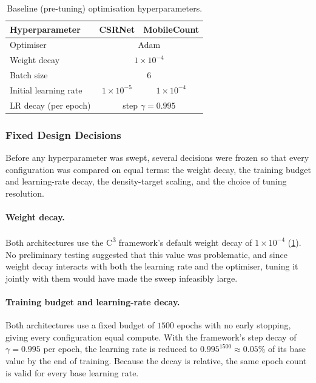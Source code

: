 \documentclass[conference]{IEEEtran}
\begin{document}
\begin{table}[t]
    \centering
    \caption{Baseline (pre-tuning) optimisation hyperparameters.}
    \label{tab:baseline_hyperparameters}
    \begin{tabular}{lcc}
        \toprule
        Hyperparameter & CSRNet & MobileCount \\
        \midrule
        Optimiser             & \multicolumn{2}{c}{Adam} \\
        Weight decay          & \multicolumn{2}{c}{$1\times10^{-4}$} \\
        Batch size            & \multicolumn{2}{c}{$6$} \\
        Initial learning rate & $1\times10^{-5}$ & $1\times10^{-4}$ \\
        LR decay (per epoch)  & \multicolumn{2}{c}{step $\gamma=0.995$} \\
        \bottomrule
    \end{tabular}
\end{table}


\subsubsection{Fixed Design Decisions}
Before any hyperparameter was swept, several decisions were frozen so that every configuration was compared on equal terms: the weight decay, the training budget and learning-rate decay, the density-target scaling, and the choice of tuning resolution.

\paragraph{Weight decay.}
Both architectures use the C\textsuperscript{3} framework's default weight decay of $1\times10^{-4}$ (\cref{tab:baseline_hyperparameters}). No preliminary
testing suggested that this value was problematic, and since weight decay interacts with both the learning rate and the optimiser, tuning it jointly with them would have made the sweep infeasibly large.

\paragraph{Training budget and learning-rate decay.}
Both architectures use a fixed budget of $1500$ epochs with no early stopping, giving every configuration equal compute. With the framework's step decay of $\gamma=0.995$ per epoch, the learning rate is reduced to $0.995^{1500}\approx0.05\%$ of its base value by the end
of training. Because the decay is relative, the same epoch count is valid for every base learning rate.
\end{document}
